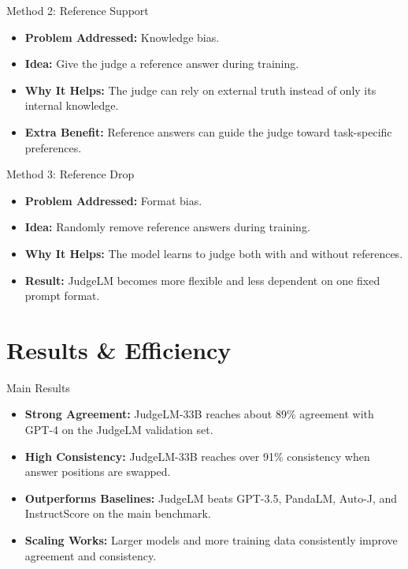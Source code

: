 \documentclass[10pt]{beamer}
\begin{document}
\begin{frame}{Method 2: Reference Support}
	\begin{itemize}
		\item \textbf{Problem Addressed:} Knowledge bias.
		\item \textbf{Idea:} Give the judge a reference answer during training.
		\item \textbf{Why It Helps:} The judge can rely on external truth instead of only its internal knowledge.
		\item \textbf{Extra Benefit:} Reference answers can guide the judge toward task-specific preferences.
	\end{itemize}
\end{frame}

\begin{frame}{Method 3: Reference Drop}
	\begin{itemize}
		\item \textbf{Problem Addressed:} Format bias.
		\item \textbf{Idea:} Randomly remove reference answers during training.
		\item \textbf{Why It Helps:} The model learns to judge both with and without references.
		\item \textbf{Result:} JudgeLM becomes more flexible and less dependent on one fixed prompt format.
	\end{itemize}
\end{frame}

\section{Results \& Efficiency}

\begin{frame}{Main Results}
	\begin{itemize}
		\item \textbf{Strong Agreement:} JudgeLM-33B reaches about 89\% agreement with GPT-4 on the JudgeLM validation set.
		\item \textbf{High Consistency:} JudgeLM-33B reaches over 91\% consistency when answer positions are swapped.
		\item \textbf{Outperforms Baselines:} JudgeLM beats GPT-3.5, PandaLM, Auto-J, and InstructScore on the main benchmark.
		\item \textbf{Scaling Works:} Larger models and more training data consistently improve agreement and consistency.
	\end{itemize}
\end{frame}
\end{document}
